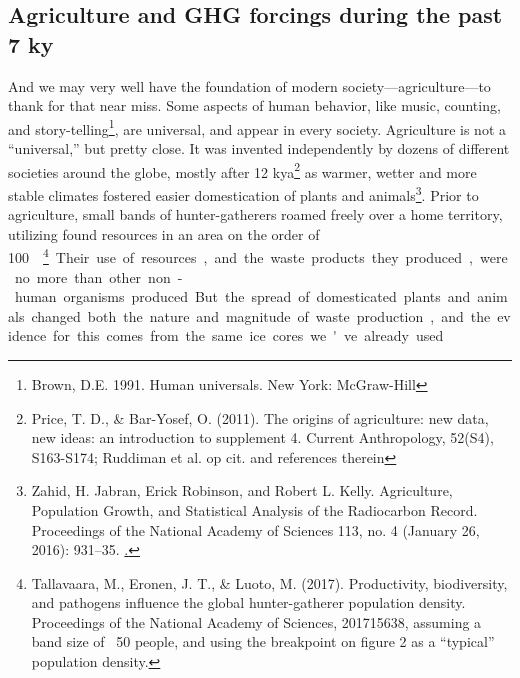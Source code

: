 \documentclass[amstex,12pt]{book}
\begin{document}
\subsection{Agriculture and GHG forcings during the past 7 ky}\label{Ag_GHG}
And we may very well have the foundation of modern society---agriculture---to thank for that near miss. Some aspects of human behavior, like music, counting, and story-telling\footnote{Brown, D.E. 1991. Human universals. New York: McGraw-Hill}, are universal, and appear in every society. Agriculture is not a ``universal,'' but pretty close. It was invented independently by dozens of different societies around the globe, mostly after 12 kya\footnote{Price, T. D., \& Bar-Yosef, O. (2011). The origins of agriculture: new data, new ideas: an introduction to supplement 4. Current Anthropology, 52(S4), S163-S174; Ruddiman et al. op cit. and references therein} as warmer, wetter and more stable climates fostered easier domestication of plants and animals\footnote{Zahid, H. Jabran, Erick Robinson, and Robert L. Kelly. Agriculture, Population Growth, and Statistical Analysis of the Radiocarbon Record. Proceedings of the National Academy of Sciences 113, no. 4 (January 26, 2016): 931–35. \href{https://doi.org/10.1073/pnas.1517650112}.}. Prior to agriculture, small bands of hunter-gatherers roamed freely over a home territory, utilizing found resources in an area on the order of \SI{100}{\kilo\metre\square}\footnote{Tallavaara, M., Eronen, J. T., \& Luoto, M. (2017). Productivity, biodiversity, and pathogens influence the global hunter-gatherer population density. Proceedings of the National Academy of Sciences, 201715638, assuming a band size of ~50 people, and using the breakpoint on figure 2 as a ``typical'' population density.}. Their use of resources, and the waste products they produced, were no more than other non-human organisms produced. But the spread of domesticated plants and animals changed both the nature and magnitude of waste production, and the evidence for this comes from the same ice cores we've already used.\\
\end{document}
